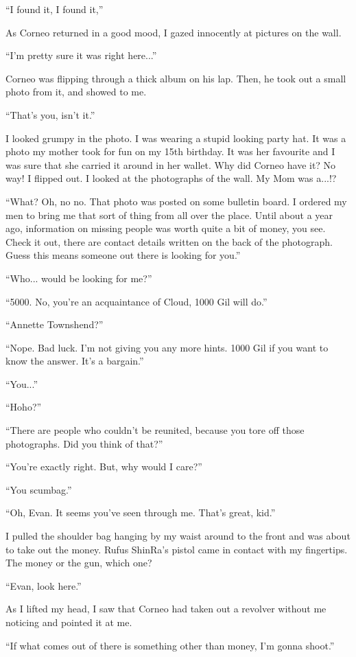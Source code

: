\documentclass[oneside]{book}
\begin{document}
“I found it, I found it,”

As Corneo returned in a good mood, I gazed innocently at pictures on the wall.

“I’m pretty sure it was right here...”

Corneo was flipping through a thick album on his lap. Then, he took out a small photo from it, and showed to me.

“That’s you, isn’t it.”

I looked grumpy in the photo. I was wearing a stupid looking party hat. It was a photo my mother took for fun on my 15th birthday. It was her favourite and I was sure that she carried it around in her wallet. Why did Corneo have it? No way! I flipped out. I looked at the photographs of the wall. My Mom was a...!?

“What? Oh, no no. That photo was posted on some bulletin board. I ordered my men to bring me that sort of thing from all over the place. Until about a year ago, information on missing people was worth quite a bit of money, you see. Check it out, there are contact details written on the back of the photograph. Guess this means someone out there is looking for you.”

“Who... would be looking for me?”

“5000. No, you’re an acquaintance of Cloud, 1000 Gil will do.”

“Annette Townshend?”

“Nope. Bad luck. I’m not giving you any more hints. 1000 Gil if you want to know the answer. It’s a bargain.”

“You...”

“Hoho?”

“There are people who couldn’t be reunited, because you tore off those photographs. Did you think of that?”

“You’re exactly right. But, why would I care?”

“You scumbag.”

“Oh, Evan. It seems you’ve seen through me. That’s great, kid.”

I pulled the shoulder bag hanging by my waist around to the front and was about to take out the money. Rufus ShinRa’s pistol came in contact with my fingertips. The money or the gun, which one?

“Evan, look here.”

As I lifted my head, I saw that Corneo had taken out a revolver without me noticing and pointed it at me.

“If what comes out of there is something other than money, I’m gonna shoot.”
\end{document}
